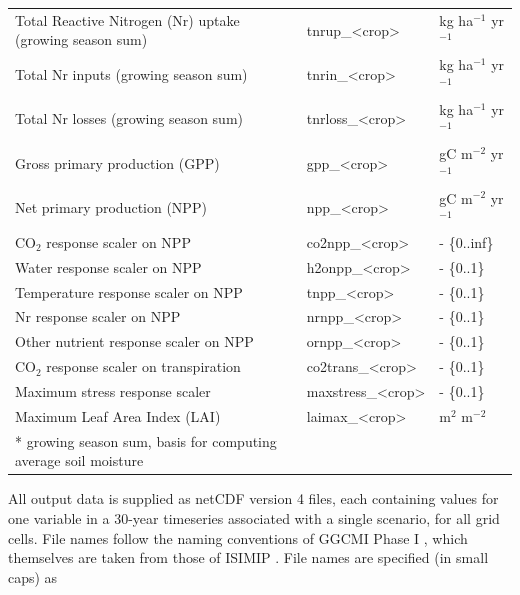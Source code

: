 \documentclass[gmd, manuscript]{copernicus} %
\begin{document}
\begin{table}[]
\begin{tabular}{lll}
    Total Reactive Nitrogen (Nr) uptake (growing season sum) & tnrup\_<crop>     & kg ha$^{-1}$ yr$^{-1}$              \\
    Total Nr inputs (growing season sum)                     & tnrin\_<crop>     & kg ha$^{-1}$ yr$^{-1}$              \\
    Total Nr losses (growing season sum)                     & tnrloss\_<crop>   & kg ha$^{-1}$ yr$^{-1}$              \\
    Gross primary production (GPP)                           & gpp\_<crop>       & gC m$^{-2}$ yr$^{-1}$               \\
    Net primary production (NPP)                             & npp\_<crop>       & gC m$^{-2}$ yr$^{-1}$               \\
    CO$_2$ response scaler on NPP                            & co2npp\_<crop>    & - \{0..inf\}                \\
    Water response scaler on NPP                             & h2onpp\_<crop>    & - \{0..1\}                  \\
    Temperature response scaler on NPP                       & tnpp\_<crop>      & - \{0..1\}                  \\
    Nr response scaler on NPP                                & nrnpp\_<crop>     & - \{0..1\}                  \\
    Other nutrient response scaler on NPP                    & ornpp\_<crop>     & - \{0..1\}                  \\
    CO$_2$ response scaler on transpiration                  & co2trans\_<crop>  & - \{0..1\}                  \\
    Maximum stress response scaler                           & maxstress\_<crop> & - \{0..1\}                  \\
    Maximum Leaf Area Index (LAI)                            & laimax\_<crop>    & m$^{2}$ m$^{-2}$           \\        
    \bottomhline
    * growing season sum, basis for computing average soil moisture & {} & {} \\
  \end{tabular}
\end{table}

All output data is supplied as netCDF version 4 files, each containing values for one variable in a 30-year timeseries associated with a single scenario, for all grid cells. File names follow the naming conventions of GGCMI Phase I \citep{Elliott2015}, which themselves are taken from those of ISIMIP \citep{frieler2017assessing}. 
File names are specified (in small caps) as 
\end{document}
